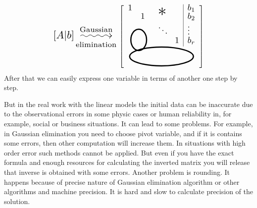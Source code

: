     \[
        \scalebox{1.5}{$[A | b] \overset{\text{Gaussian}}{ \underset{\text{elimination}}{\xymatrix@C=3em{{}\ar@{~>}[r]&{}}}}$}
        \left[\begin{tabular}{clp{0.1cm}p{0.1cm}l}
            \multicolumn{1}{l}{\scalebox{1.25}{$1$}}        &         &\multicolumn{1}{l}{\multirow{2}{*}{\scalebox{2.5}{$\mathlarger{*}$}}}  & \multicolumn{1}{c|}{} & \scalebox{1.25}{$b_1$}    \\
\multicolumn{1}{l}{}         & \scalebox{1.25}{$1$}       & \multicolumn{1}{c}{} & \multicolumn{1}{c|}{}                   & \scalebox{1.25}{$b_2$}    \\
            \multicolumn{2}{c}{\multirow{2}{*}{
                \begin{tikzpicture}[x=0.75pt,y=0.75pt,yscale=-1,xscale=1]
                    \draw  [line width=1.75]  (304.32,138.5) .. controls (312.66,138.5) and (319.43,147.68) .. (319.43,159) .. controls (319.43,170.32) and (312.66,179.5) .. (304.32,179.5) .. controls (295.98,179.5) and (289.21,170.32) .. (289.21,159) .. controls (289.21,147.68) and (295.98,138.5) .. (304.32,138.5) -- cycle ;
                    \end{tikzpicture}
            }} & \scalebox{1.25}{$\ddots$}              & \multicolumn{1}{l|}{}  & \scalebox{1.25}{$\vdots$} \\
            \multicolumn{2}{c}{}                   &                       & \multicolumn{1}{l|}{\scalebox{1.25}{$1$}} & \scalebox{1.25}{$b_r$}    \\[0.05cm]
            \multicolumn{5}{c}{\begin{tikzpicture}[x=0.75pt,y=0.75pt,yscale=-1,xscale=1]
                \draw [line width=1.75]  (246,143.5) .. controls (246,133.56) and (273.41,125.5) .. (307.21,125.5) .. controls (341.02,125.5) and (368.43,133.56) .. (368.43,143.5) .. controls (368.43,153.44) and (341.02,161.5) .. (307.21,161.5) .. controls (273.41,161.5) and (246,153.44) .. (246,143.5) -- cycle ;
                \end{tikzpicture}
                }                                                                        
            \end{tabular}\right]
    \]
    After that we can easily express one variable in terms of another one step by step.
    \par
    But in the real work with the linear models the initial data can be inaccurate due to the observational errors in some physic cases or human reliability in, for example, social or business situations. It can lead to some problems. For example, in Gaussian elimination you need to choose pivot variable, and if it is contains some errors, then other computation will increase them. In situations with high order error such methods cannot be applied. But even if you have the exact formula and enough resources for calculating the inverted matrix you will release that inverse is obtained with some errors. Another problem is rounding. It happens because of precise nature of Gaussian elimination algorithm or other algorithms and machine precision. It is hard and slow to calculate precision of the solution.
